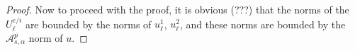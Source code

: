 \documentclass[12pt]{article}
\newtheorem{prop}[thm]{Proposition}
\newcommand{\calA}{{\mathcal A}}
\begin{document}
\begin{proof}
    


Now to proceed with the proof, it is obvious (???) that the norms of the $U_\ell^{e/i}$ are bounded by the norms of $u_\ell^{1}$, $u_\ell^2$, and these
norms are bounded by the $\calA^p_{s,\alpha}$ norm of $u$. 
        

\end{proof}
\end{document}
